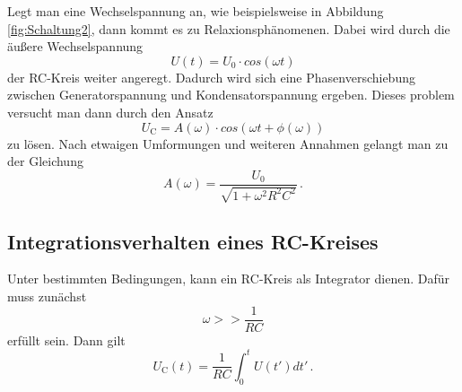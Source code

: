 Legt man eine Wechselspannung an, wie beispielsweise in Abbildung \ref{fig:Schaltung2}, dann kommt es zu
Relaxionsphänomenen.
Dabei wird durch die äußere Wechselspannung
\begin{equation}
    U(t) = U_0 \cdot cos(\omega t)
\end{equation}
der RC-Kreis weiter angeregt.
Dadurch wird sich eine Phasenverschiebung zwischen Generatorspannung und Kondensatorspannung ergeben.
Dieses problem versucht man dann durch den Ansatz
\begin{equation*}
    U_\text{C} = A(\omega) \cdot cos(\omega t + \phi(\omega))
\end{equation*}
zu lösen.
Nach etwaigen Umformungen und weiteren Annahmen gelangt man zu der Gleichung
\begin{equation}
    A(\omega) = \frac {U_0}{\sqrt{1 + \omega^2 R^2 C^2}} \, .
\end{equation}

\subsection{Integrationsverhalten eines RC-Kreises}
Unter bestimmten Bedingungen, kann ein RC-Kreis als Integrator dienen.
Dafür muss zunächst
\begin{equation*}
    \omega >> \frac {1}{R C}
\end{equation*}
erfüllt sein. Dann gilt
\begin{equation}
    U_\text{C} (t) = \frac{1}{R C} \int_0^t U(t')dt' \, .
\end{equation}